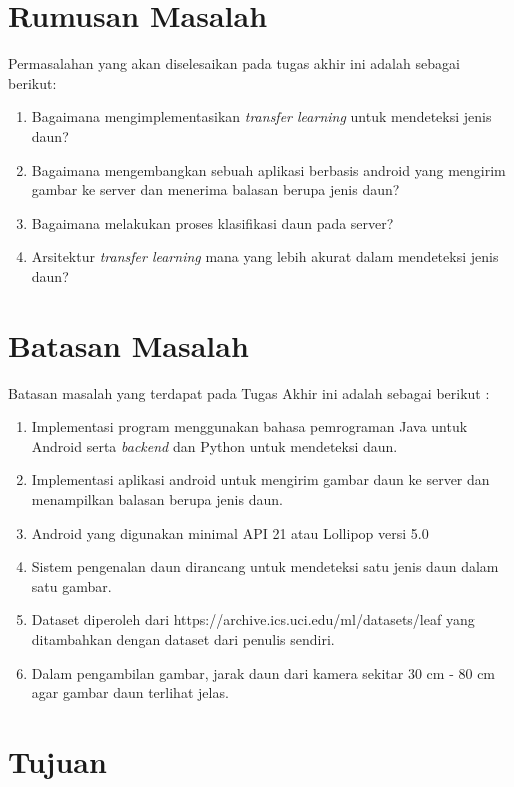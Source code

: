 \section {Rumusan Masalah}

Permasalahan yang akan diselesaikan pada tugas akhir ini adalah sebagai berikut:

\begin {enumerate}
\item Bagaimana mengimplementasikan \textit{transfer learning} untuk mendeteksi jenis daun? 
\item Bagaimana mengembangkan sebuah aplikasi berbasis android yang mengirim gambar ke server dan menerima balasan berupa jenis daun?
\item Bagaimana melakukan proses klasifikasi daun pada server?
\item Arsitektur \textit{transfer learning} mana yang lebih akurat dalam mendeteksi jenis daun? 
\end {enumerate}

\section {Batasan Masalah}

Batasan masalah yang terdapat pada Tugas Akhir ini adalah sebagai berikut : 
\begin {enumerate}
\item Implementasi program menggunakan bahasa pemrograman Java untuk Android serta \textit{backend} dan Python untuk mendeteksi daun. 
\item Implementasi aplikasi android untuk mengirim gambar daun ke server dan menampilkan balasan berupa jenis daun.
\item Android yang digunakan minimal API 21 atau Lollipop versi 5.0
\item Sistem pengenalan daun dirancang untuk mendeteksi satu jenis daun dalam satu gambar. 
\item Dataset diperoleh dari https://archive.ics.uci.edu/ml/datasets/leaf yang ditambahkan dengan dataset dari penulis sendiri. 
\item Dalam pengambilan gambar, jarak daun dari kamera sekitar 30 cm - 80 cm agar gambar daun terlihat jelas.

\end {enumerate}

\section {Tujuan}

